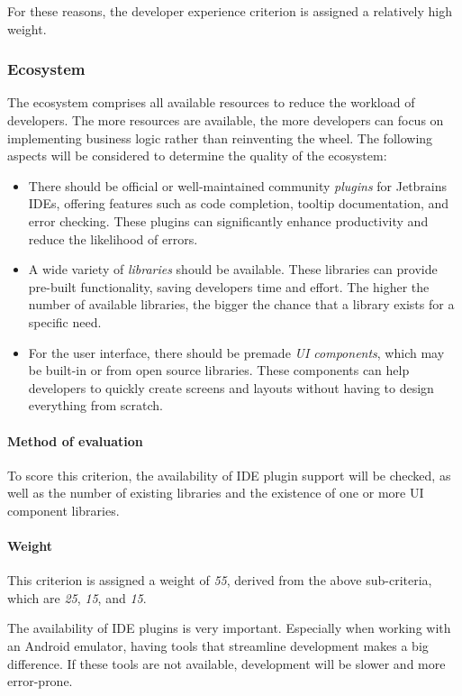 For these reasons, the developer experience criterion is assigned a relatively high weight.

\subsubsection{Ecosystem}\label{subsubsec:ecosystem}
The ecosystem comprises all available resources to reduce the workload of developers.
The more resources are available, the more developers can focus on implementing business logic rather than reinventing the wheel.
The following aspects will be considered to determine the quality of the ecosystem:

\begin{itemize}
	\item There should be official or well-maintained community \emph{plugins} for Jetbrains IDEs, offering features such as code completion, tooltip documentation, and error checking.
	      These plugins can significantly enhance productivity and reduce the likelihood of errors.
	\item A wide variety of \emph{libraries} should be available.
	      These libraries can provide pre-built functionality, saving developers time and effort.
	      The higher the number of available libraries, the bigger the chance that a library exists for a specific need.
	\item For the user interface, there should be premade \emph{UI components}, which may be built-in or from open source libraries.
	      These components can help developers to quickly create screens and layouts without having to design everything from scratch.
\end{itemize}

\paragraph{Method of evaluation}
To score this criterion, the availability of IDE plugin support will be checked, as well as the number of existing libraries and the existence of one or more UI component libraries.

\paragraph{Weight}
This criterion is assigned a weight of \emph{55}, derived from the above sub-criteria, which are \emph{25}, \emph{15}, and \emph{15}.

The availability of IDE plugins is very important.
Especially when working with an Android emulator, having tools that streamline development makes a big difference.
If these tools are not available, development will be slower and more error-prone.

